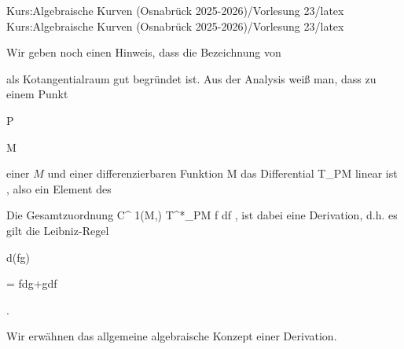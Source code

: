 Kurs:Algebraische Kurven (Osnabrück 2025-2026)/Vorlesung 23/latex
Kurs:Algebraische Kurven (Osnabrück 2025-2026)/Vorlesung 23/latex

\setcounter{section}{23}




Wir geben noch einen Hinweis, dass die Bezeichnung von

 als Kotangentialraum gut begründet ist. Aus der Analysis weiß man, dass zu einem Punkt


\mavergleichskette

{\vergleichskette

{ P
}

{ \in }{ M
}

{  }{
}

{    }{
}

{   }{
}

}
{}{}{}
einer
$M$ und einer differenzierbaren Funktion
 {M} {\R
} {}
das Differential
 {T_PM} { \R
} {}
linear ist
 {} {,}
also ein Element des


 Die Gesamtzuordnung
\maabbeledisp {} { C^ 1(M,\R) } { T^*_PM
} {f} {df
} {,}
ist dabei eine Derivation, d.h. es gilt die Leibniz-Regel


\mavergleichskettedisp

{\vergleichskette

{ d(fg)
}

{ =} { fdg+gdf
}

{ } {
}

{ } {
}

{ } {
}

}
{}{}{.}


Wir erwähnen das allgemeine algebraische Konzept einer Derivation.



{}

